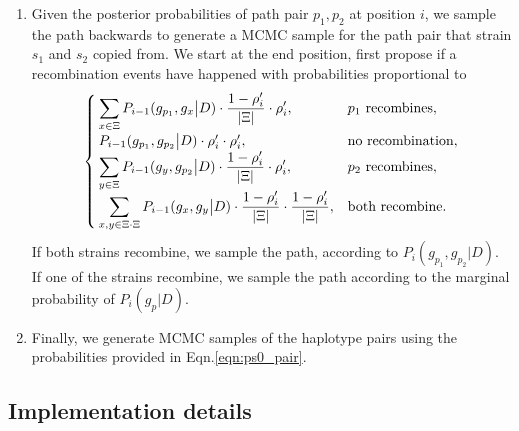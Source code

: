 \documentclass{bioinfo}
\begin{document}
\begin{enumerate}
\item Given the posterior probabilities of path pair $p_1,p_2$ at position $i$, we sample the path backwards to generate a MCMC sample for the path pair that strain $s_1$ and $s_2$ copied from. We start at the end position, first propose if a recombination events have happened with probabilities proportional to
$$\begin{cases}
\displaystyle\sum_{x\in \Xi}P_{i-1}(g_{p_1},g_{x}\big{|}D) \cdot \frac{1-\rho_i'}{|\Xi|}\cdot \rho_i', & p_1 \text{ recombines} \label{eqn:prob.update.two.v}, \\
P_{i-1}(g_{p_1},g_{p_2}\big{|}D) \cdot \rho_i' \cdot \rho_i', & \text{no recombination},\\
\displaystyle\sum_{y\in \Xi}P_{i-1}(g_{y},g_{p_2}\big{|}D) \cdot \frac{1-\rho_i'}{|\Xi|} \cdot \rho_i', & p_2 \text{ recombines} \label{eqn:prob.update.two.u}, \\
\displaystyle\sum_{x,y\in \Xi \cdot \Xi} P_{i-1}(g_{x},g_{y}\big{|}D) \cdot\frac{1-\rho_i'}{|\Xi|} \cdot \frac{1-\rho_i'}{|\Xi|} , & \text{both recombine}.
\end{cases}$$
If both strains recombine, we sample the path, according to $P_i(g_{p_1}, g_{p_2}|D)$. If one of the strains recombine, we sample the path according to the marginal probability of $P_i(g_{p}|D)$.

\item Finally, we generate MCMC samples of the haplotype pairs using the probabilities provided in Eqn.\eqref{eqn:ps0_pair}.

\end{enumerate}


\subsection{Implementation details}
\end{document}
